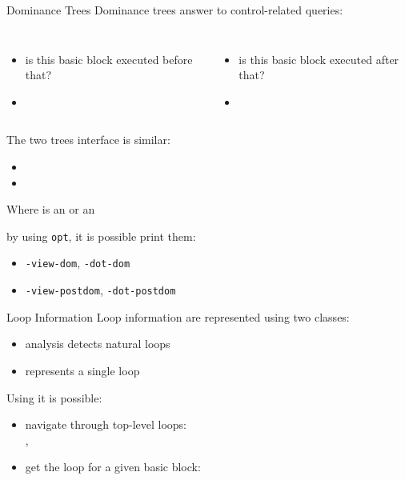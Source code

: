 \begin{frame}{Dominance Trees}
Dominance trees answer to control-related queries:

\begin{columns}[t]
\begin{itemize}
\item is this basic block executed before that?
\item {}
\end{itemize}

\begin{itemize}
\item is this basic block executed after that?
\item {}
\end{itemize}
\end{columns}

\vfill
The two trees interface is similar:

\begin{itemize}
\item {}
\item {}
\end{itemize}

Where  is an  or an

\vfill
by using \texttt{opt}, it is possible print them:

\begin{itemize}
\item \texttt{-view-dom}, \texttt{-dot-dom}
\item \texttt{-view-postdom}, \texttt{-dot-postdom}
\end{itemize}
\end{frame}

\begin{frame}{Loop Information}
Loop information are represented using two classes:

\begin{itemize}
\item {} analysis detects natural loops
\item {} represents a single loop
\end{itemize}

\vfill
Using  it is possible:

\begin{itemize}
\item navigate through top-level loops: \\
      , 
\item get the loop for a given basic block: \\
\end{itemize}
\end{frame}

